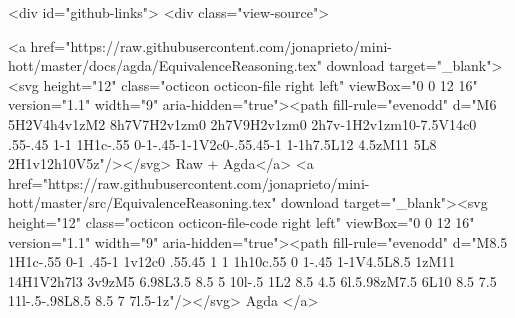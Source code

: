   <div id="github-links">
    <div class="view-source">
      
        <a href="https://raw.githubusercontent.com/jonaprieto/mini-hott/master/docs/agda/EquivalenceReasoning.tex" download target="_blank"><svg height="12" class="octicon octicon-file right left" viewBox="0 0 12 16" version="1.1" width="9" aria-hidden="true"><path fill-rule="evenodd" d="M6 5H2V4h4v1zM2 8h7V7H2v1zm0 2h7V9H2v1zm0 2h7v-1H2v1zm10-7.5V14c0 .55-.45 1-1 1H1c-.55 0-1-.45-1-1V2c0-.55.45-1 1-1h7.5L12 4.5zM11 5L8 2H1v12h10V5z"/></svg> Raw + Agda</a>
        <a href="https://raw.githubusercontent.com/jonaprieto/mini-hott/master/src/EquivalenceReasoning.tex" download target="_blank"><svg height="12" class="octicon octicon-file-code right left" viewBox="0 0 12 16" version="1.1" width="9" aria-hidden="true"><path fill-rule="evenodd" d="M8.5 1H1c-.55 0-1 .45-1 1v12c0 .55.45 1 1 1h10c.55 0 1-.45 1-1V4.5L8.5 1zM11 14H1V2h7l3 3v9zM5 6.98L3.5 8.5 5 10l-.5 1L2 8.5 4.5 6l.5.98zM7.5 6L10 8.5 7.5 11l-.5-.98L8.5 8.5 7 7l.5-1z"/></svg> Agda </a>
      
